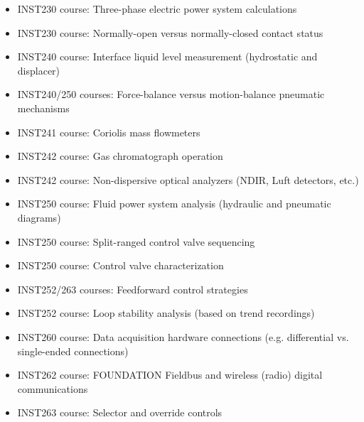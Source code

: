 \begin{itemize}
\item{} INST230 course: Three-phase electric power system calculations
\item{} INST230 course: Normally-open versus normally-closed contact status
\item{} INST240 course: Interface liquid level measurement (hydrostatic and displacer)
\item{} INST240/250 courses: Force-balance versus motion-balance pneumatic mechanisms
\item{} INST241 course: Coriolis mass flowmeters
\item{} INST242 course: Gas chromatograph operation
\begin{itemize}

\end{itemize}
\item{} INST242 course: Non-dispersive optical analyzers (NDIR, Luft detectors, etc.)
\begin{itemize}

\end{itemize}
\item{} INST250 course: Fluid power system analysis (hydraulic and pneumatic diagrams)
\item{} INST250 course: Split-ranged control valve sequencing
\item{} INST250 course: Control valve characterization
\begin{itemize}

\end{itemize}
\item{} INST252/263 courses: Feedforward control strategies
\begin{itemize}

\end{itemize}
\item{} INST252 course: Loop stability analysis (based on trend recordings)
\item{} INST260 course: Data acquisition hardware connections (e.g. differential vs. single-ended connections)
\item{} INST262 course: FOUNDATION Fieldbus and wireless (radio) digital communications
\begin{itemize}

\end{itemize}
\item{} INST263 course: Selector and override controls
\end{itemize}

